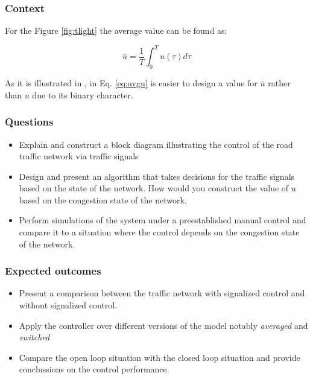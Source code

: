 \documentclass[]{book}
\theoremstyle{definition}
\theoremstyle{definition}
\theoremstyle{definition}
\theoremstyle{remark}
\begin{document}
\hypertarget{context-3}{%
\subsubsection*{Context}\label{context-3}}

For the Figure \ref{fig:tlight} the average value can be found as:

\begin{equation}
\bar{u} = \frac{1}{T}\int_0^T u(\tau) d\tau \label{eq:avgu}
\end{equation}

As it is illustrated in \autocite{Grandinetti2016}, in Eq. \eqref{eq:avgu}
is easier to design a value for \(\bar{u}\) rather than \(u\) due to its
binary character.

\hypertarget{questions-2}{%
\subsubsection*{Questions}\label{questions-2}}

\begin{itemize}
\item
  Explain and construct a block diagram illustrating the control of the
  road traffic network via traffic signals
\item
  Design and present an algorithm that takes decisions for the traffic
  signals based on the state of the network. How would you construct the
  value of \(u\) based on the congestion state of the network.
\item
  Perform simulations of the system under a preestablished manual
  control and compare it to a situation where the control depends on the
  congestion state of the network.
\end{itemize}

\hypertarget{expected-outcomes-2}{%
\subsubsection*{Expected outcomes}\label{expected-outcomes-2}}

\begin{itemize}
\item
  Present a comparison between the traffic network with signalized
  control and without signalized control.
\item
  Apply the controller over different versions of the model notably
  \emph{averaged} and \emph{switched}
\item
  Compare the open loop situation with the closed loop situation and
  provide conclussions on the control performance.
\end{itemize}
\end{document}
